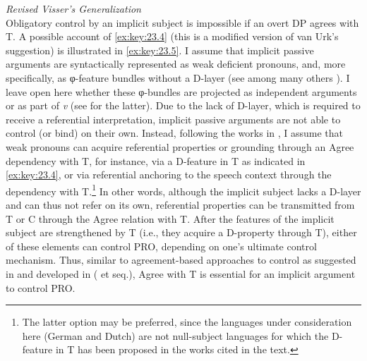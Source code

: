 \documentclass[output=paper]{langsci/langscibook}
\begin{document}
\ea\label{ex:key:23.4} \emph{Revised Visser’s Generalization} \parencite[172, (12)]{vanUrk2013}\\
    Obligatory control by an implicit subject is impossible if an overt DP
    agrees with T.
\z
%
A possible account of \eqref{ex:key:23.4} (this is a modified version of van Urk’s suggestion)
is illustrated in \eqref{ex:key:23.5}. I assume that implicit passive arguments are
syntactically represented as weak deficient pronouns, and, more specifically,
as φ-feature bundles without a D-layer  (see among many others
\citealt{CarSta1999,DecWil2002,Landau2010,Roberts2010,Roberts2010c}). I leave
open here whether these φ-bundles are projected as independent arguments or as
part of \emph{v} (see \citealt{Legate2012,Legate2014} for the latter). Due to
the lack of D-layer, which is required to receive a referential interpretation,
implicit passive arguments are not able to control (or bind) on their own.
Instead, following the works in \citet{BibHolRobShee2010}, I assume that weak
pronouns can acquire referential properties or grounding through an Agree
dependency with T, for instance, via a D-feature in T as indicated in \eqref{ex:key:23.4}, or
via referential anchoring to the speech context through the dependency with
T.\footnote{The latter option may be preferred, since the languages under
consideration here (German and Dutch) are not null-subject languages for which
the D-feature in T has been proposed in the works cited in the text.} In other
words, although the implicit subject lacks a D-layer and can thus not refer on
its own, referential properties can be transmitted from T or C through the
Agree relation with T. After the features of the implicit subject are
strengthened by T (i.e., they acquire a D-property through T), either of these
elements can control PRO, depending on one’s ultimate control mechanism. Thus,
similar to agreement-based approaches to control as suggested in
\citet{Borer1989} and developed in \citeauthor{Landau2000}
(\citeyear{Landau2000} et seq.), Agree with T is essential for an implicit
argument to control PRO.\largerpage[1]
\end{document}

